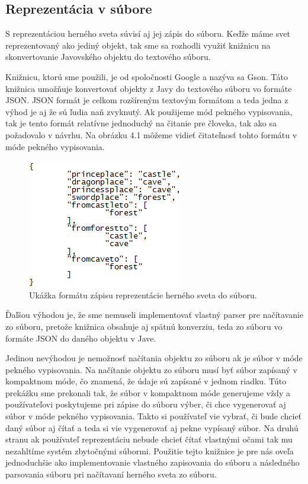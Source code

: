 \subsection{Reprezentácia v súbore}
S reprezentáciou herného sveta súvisí aj jej zápis do súboru. Keďže máme svet reprezentovaný ako jediný objekt, tak sme sa rozhodli využiť knižnicu na skonvertovanie Javovského objektu do textového súboru.\par
Knižnicu, ktorú sme použili, je od spoločnosti Google a nazýva sa Gson. Táto knižnica umožňuje konvertovať objekty z Javy do textového súboru vo formáte JSON. JSON formát je celkom rozšíreným textovým formátom a teda jedna z výhod je aj že sú ľudia naň zvyknutý. Ak použijeme mód pekného vypisovania, tak je tento formát relatívne jednoduchý na čitanie pre človeka, tak ako sa požadovalo v návrhu. Na obrázku 4.1 môžeme vidieť čitateľnosť tohto formátu v móde pekného vypisovania.
\begin{figure}[H] 
\begin{center}
\includegraphics[scale=1.1]{img/subor_impl.png}
\caption{Ukážka formátu zápisu reprezentácie herného sveta do súboru.}
\label{fig:ch41}
\end{center}
\end{figure}
Ďaľšou výhodou je, že sme nemuseli implementovať vlastný parser pre načítavanie zo súboru, pretože knižnica obsahuje aj spätnú konverziu, teda zo súboru vo formáte JSON do daného objektu v Jave.\par
Jedinou nevýhodou je nemožnosť načítania objektu zo súboru ak je súbor v móde pekného vypisovania. Na načítanie objektu zo súboru musí byť súbor zapísaný v kompaktnom móde, čo znamená, že údaje sú zapísané v jednom riadku. Túto prekážku sme prekonali tak, že súbor v kompaktnom móde generujeme vždy a používateľovi poskytujeme pri zápise do súboru výber, či chce vygenerovať aj súbor v móde pekného vypisovania. Takto si používateľ vie vybrať, či bude chcieť daný súbor aj čítať a teda si vie vygenerovať aj pekne vypísaný súbor. Na druhú stranu ak používateľ reprezentáciu nebude chcieť čítať vlastnými očami tak mu nezahltíme systém zbytočnými súbormi. Použitie tejto knižnice je pre nás oveľa jednoduchšie ako implementovanie vlastného zapisovania do súboru a následného parsovania súboru pri načítavaní herného sveta zo súboru.
